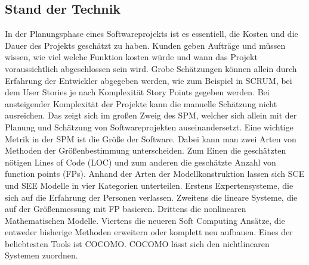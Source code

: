 \subsection{Stand der Technik}
In der Planungsphase eines Softwareprojekts ist es essentiell, die Kosten und die Dauer des Projekts geschätzt zu haben. Kunden geben Aufträge und müssen wissen, wie viel welche Funktion kosten würde und wann das Projekt voraussichtlich abgeschlossen sein wird. Grobe Schätzungen können allein durch Erfahrung der Entwickler abgegeben werden, wie zum Beispiel in SCRUM, bei dem User Stories je nach Komplexität Story Points gegeben werden. Bei ansteigender Komplexität der Projekte kann die manuelle Schätzung nicht ausreichen. Das zeigt sich im großen Zweig des SPM, welcher sich allein mit der Planung und Schätzung von Softwareprojekten auseinandersetzt. Eine wichtige Metrik in der SPM ist die Größe der Software. Dabei kann man zwei Arten von Methoden der Größenbestimmung unterscheiden. Zum Einen die geschätzten nötigen Lines of Code (LOC) und zum anderen die geschätzte Anzahl von function points (FPs). Anhand der Arten der Modellkonstruktion lassen sich SCE und SEE Modelle in vier Kategorien unterteilen. Erstens Expertensysteme, die sich auf die Erfahrung der Personen verlassen\cite{Heemstra1992}. Zweitens die lineare Systeme, die auf der Größenmessung mit FP basieren\cite{Matson1994}. Drittens die nonlinearen Mathematischen Modelle. Viertens die neueren Soft Computing Ansätze, die entweder bisherige Methoden erweitern oder komplett neu aufbauen\cite{Huang2007}\cite{Huang2006}. Eines der beliebtesten Tools ist COCOMO.\cite{Jain2016} COCOMO lässt sich den nichtlinearen Systemen zuordnen.

